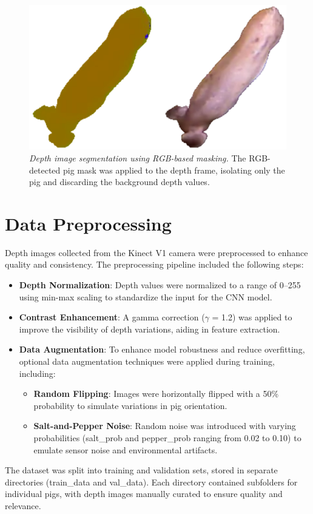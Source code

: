 {\begin{figure}[h]
	\centering
	\includegraphics[height=0.25\textheight]{figures/Depth image segmentation}
	\caption{\textit{Depth image segmentation using RGB-based masking.} The RGB-detected pig mask was applied to the depth frame, isolating only the pig and discarding the background depth values.}
	\label{fig:Depth image segmentation}
\end{figure}

\section{Data Preprocessing}
Depth images collected from the Kinect V1 camera were preprocessed to enhance quality and consistency. The preprocessing pipeline included the following steps:

\begin{itemize}
	\item \textbf{Depth Normalization}: Depth values were normalized to a range of 0–255 using min-max scaling to standardize the input for the CNN model.
	\item \textbf{Contrast Enhancement}: A gamma correction ($\gamma$ = 1.2) was applied to improve the visibility of depth variations, aiding in feature extraction.
	\item \textbf{Data Augmentation}: To enhance model robustness and reduce overfitting, optional data augmentation techniques were applied during training, including:
	\begin{itemize}
		\item \textbf{Random Flipping}: Images were horizontally flipped with a 50\% probability to simulate variations in pig orientation.
		\item \textbf{Salt-and-Pepper Noise}: Random noise was introduced with varying probabilities (salt\_prob and pepper\_prob ranging from 0.02 to 0.10) to emulate sensor noise and environmental artifacts.
	\end{itemize}
\end{itemize}
The dataset was split into training and validation sets, stored in separate directories (train\_data and val\_data). Each directory contained subfolders for individual pigs, with depth images manually curated to ensure quality and relevance.

}
